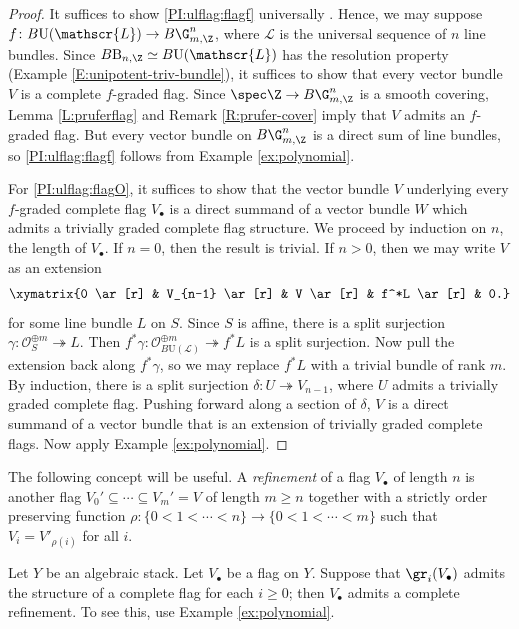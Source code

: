 \documentclass[reqno,a4paper]{amsart}
\numberwithin{Theorem}{section}
\newcommand{\Orb}{\mathcal{O}}
\renewcommand{\U}{\mathrm{U}}
\renewcommand{\B}{\mathrm{B}}
\theoremstyle{plain}
\theoremstyle{remark}
\newcommand{\classB}{B}
\begin{document}
\begin{proof}
  It suffices to show \eqref{PI:ulflag:flagf} universally
  \cite[Prop. 2.8(iv)]{2013arXiv1306.5418G}. Hence, we may suppose
  $f\colon \classB\U(\mathscr{L}) \to \classB\G_{m,\Z}^n$, where
  $\mathscr{L}$ is the universal sequence of $n$ line bundles. Since
  $\classB \B_{n,\Z} \simeq B\U(\mathscr{L})$ has the resolution
  property (Example \ref{E:unipotent-triv-bundle}), it suffices to
  show that every vector bundle $V$ is a complete $f$-graded
  flag. Since $\spec \Z \to \classB \G_{m,\Z}^n$ is a smooth covering,
  Lemma \ref{L:pruferflag} and Remark \ref{R:prufer-cover} imply that
  $V$ admits an $f$-graded flag. But every vector bundle on
  $\classB\G_{m,\Z}^n$ is a direct sum of line bundles, so
  \eqref{PI:ulflag:flagf} follows from Example \ref{ex:polynomial}.

  For \eqref{PI:ulflag:flagO}, it suffices to show that the vector bundle $V$ underlying every $f$-graded complete flag
  $V_{\bullet}$ is a direct summand of a vector bundle $W$ which admits a trivially graded complete flag structure. We proceed
  by induction on $n$, the length of $V_\bullet$. If $n=0$, then the
  result is trivial. If $n>0$, then we may write $V$ as an
  extension
  \[
    \xymatrix{0 \ar[r] & V_{n-1} \ar[r] & V \ar[r] & f^*L
      \ar[r] & 0.}
  \] 
  for some line bundle $L$ on $S$. Since $S$ is affine, there is a
  split surjection
  $\gamma \colon \Orb_S^{\oplus m} \twoheadrightarrow L$. Then $f^*\gamma \colon \Orb^{\oplus m}_{\classB \U(\mathscr{L})} \twoheadrightarrow f^*L$ is a split surjection. Now pull the extension back along $f^*\gamma$, so we may replace $f^*L$ with a
  trivial bundle of rank $m$. By induction, there is a split
  surjection $\delta \colon U \twoheadrightarrow V_{n-1}$, where $U$
  admits a trivially graded complete flag. Pushing forward along a section of $\delta$,
  $V$ is a direct summand of a vector bundle that is an
  extension of trivially graded complete flags. Now apply Example
  \ref{ex:polynomial}. \end{proof}
  

The following concept will be useful.
A \emph{refinement} of a flag $V_\bullet$ of length
$n$ is another flag 
$V_0' \subseteq \cdots \subseteq V_m' = V$ of length $m\geq n$
together with a strictly order preserving function
$\rho \colon \{0<1<\cdots<n\} \to \{0< 1 < \cdots < m\}$ such that
$V_i = V'_{\rho(i)}$ for all $i$. 

\begin{Example}\label{E:complete-refinement}
  Let $Y$ be an algebraic stack. Let $V_\bullet$ be a flag on
  $Y$. Suppose that $\gr_i(V_\bullet)$ admits the structure of a complete flag for each
  $i\geq 0$; then $V_\bullet$ admits a complete refinement. To see
  this, use Example \ref{ex:polynomial}. \end{Example}
\end{document}
